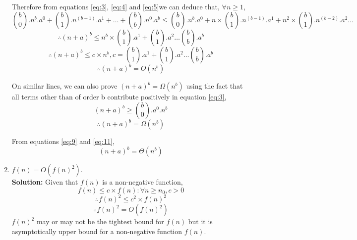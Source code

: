 \documentclass[11pt]{article}
\begin{document}
\begin{enumerate}
	Therefore from equations \ref{eq:3}, \ref{eq:4} and \ref{eq:5}we can deduce that, $\forall n \geq 1$, \\
	\begin{equation} \label{eq:6}
		{b \choose 0}.n^{b}.a^0 + {b \choose 1}.n^{(b-1)}.a^1 + \ldots + {b \choose b}.n^{0}.a^b \le {b \choose 0}.n^{b}.a^0 +  n \times {b \choose 1}.n^{(b-1)}.a^1 + n^{2} \times {b \choose 1}.n^{(b-2)}.a^{2} \ldots
	\end{equation}
	\begin{equation} \label{eq:7}
		\therefore (n+a)^b \le n^{b} \times {b \choose 1}.a^1 + {b \choose 1}.a^{2} \ldots {b \choose b}.a^{b}
		\end{equation}
	\begin{equation} \label{eq:8}
		\therefore (n+a)^b \le c \times n^{b}, c = {b \choose 1}.a^1 + {b \choose 1}.a^{2} \ldots {b \choose b}.a^{b}
	\end{equation}
	\begin{equation} \label{eq:9}
		\therefore (n+a)^b = O(n^{b})
	\end{equation}
	
	On similar lines, we can also prove $(n+a)^b=\Omega(n^b)$ using the fact that all terms other than of order b contribute positively in equation \ref{eq:3},
	\begin{equation} \label{eq:10}
		(n+a)^b \ge {b \choose 0}.a^0.n^{b}
	\end{equation}
	\begin{equation} \label{eq:11}
		\therefore (n+a)^b=\Omega(n^b)
	\end{equation}
	
	From equations \ref{eq:9} and \ref{eq:11},
	\begin{equation} \label{eq:12}
		\boxed{(n+a)^b=\Theta(n^b)}
	\end{equation}
	
    \item $f(n)=O(f(n)^2)$. \\
    \textbf{Solution:}
   	Given that $f(n)$ is a non-negative function,
    \begin{equation} \label{eq:13}
		f(n) \le  c \times f(n) : \forall n \ge n_0, c > 0
    \end{equation}
    \begin{equation} \label{eq:14}
		\therefore f(n)^2 \le  c^2 \times f(n)^2
	\end{equation}
	\begin{equation} \label{eq:15}
		\boxed{\therefore f(n)^2 =  O(f(n)^2)}
	\end{equation}
	$f(n)^2$ may or may not be the tightest bound for $f(n)$ but it is asymptotically upper bound for a non-negative function $f(n)$.
	

\end{enumerate}
\end{document}
